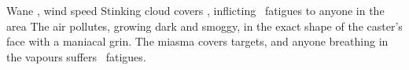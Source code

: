   {\mWater}%
  {Wane}%
  {\detailed, \duplicated}%
  {wind speed}%
  {Stinking cloud covers \spellArea, inflicting ~\glspl{fatigue} to anyone in the area}%
  {
    The air pollutes, growing dark and smoggy, in the exact shape of the caster's face with a maniacal grin.
    The miasma covers \spellArea targets, and anyone breathing in the vapours suffers ~\glspl{fatigue}.
  }



